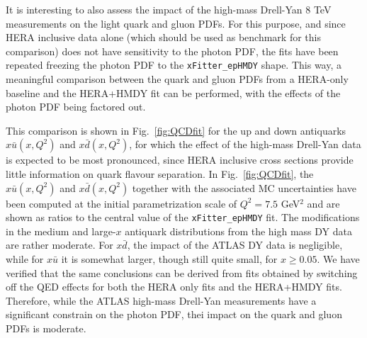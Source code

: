 It is interesting to also assess the impact of the high-mass Drell-Yan 8 TeV measurements on
the light quark and gluon PDFs.
%
For this purpose, and since HERA inclusive data alone (which should be used as
benchmark for this comparison) does not have sensitivity to the photon
PDF, the fits have been repeated freezing the photon PDF to the
{\tt xFitter\_epHMDY} shape.
%
This way, 
a meaningful comparison between the quark and gluon PDFs
from a HERA-only
baseline and the HERA+HMDY fit can be performed, with the effects of
the photon PDF being factored out.

This comparison is shown in Fig.~\ref{fig:QCDfit} for the up and down
antiquarks $x\bar{u}(x,Q^2)$ and $x\bar{d}(x,Q^2)$, for which the effect of the high-mass Drell-Yan data is
expected to be most pronounced, since HERA inclusive cross sections
provide little information on quark flavour separation.
%
In Fig.~\ref{fig:QCDfit}, the $x\bar{u}(x,Q^2)$ and $x\bar{d}(x,Q^2)$ together
with the associated MC uncertainties have been computed
at the initial parametrization scale of $Q^2=7.5$ GeV$^2$ and
are shown as ratios to the central value of the {\tt xFitter\_epHMDY}
fit.
%
The modifications in the medium
and large-$x$ antiquark distributions from the high mass DY data are
rather moderate.
%
For $x\bar{d}$, the impact of the ATLAS DY data is negligible, while
for $x\bar{u}$ it is somewhat larger, though still quite small,
for $x\ge 0.05$.
%
We have verified that the same conclusions can be derived
from fits obtained by switching
off the QED effects for both the HERA only fits and the HERA+HMDY fits.
%
Therefore, while the ATLAS high-mass Drell-Yan measurements have a significant constrain
on the photon PDF, thei impact on the quark and gluon PDFs is moderate.


